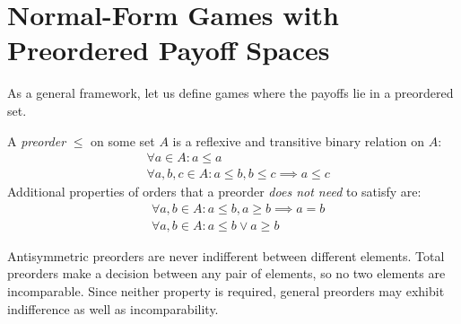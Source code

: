\documentclass[a4paper]{scrreprt}
\begin{document}
    \section{Normal-Form Games with Preordered Payoff Spaces}
    \label{sec:preorderedPayoffSpaceGames}
    
    As a general framework, let us define games where the payoffs lie in a preordered set.
    \begin{defn}[Preorder]
        A \emph{preorder} $\leq$ on some set $A$ is a reflexive and transitive binary relation on $A$:
        \begin{align*}
            &\forall a \in A: a \leq a \tag{Reflexivity} \\
            &\forall a, b, c \in A: a \leq b, b \leq c \implies a \leq c \tag{Transitivity}
        \end{align*}
        Additional properties of orders that a preorder \emph{does not need} to satisfy are:
        \begin{align*}
            &\forall a, b \in A: a \leq b, a \geq b \implies a = b \tag{Antisymmetry} \\
            &\forall a, b \in A: a \leq b \vee a \geq b \tag{Totality}
        \end{align*}
    \end{defn}
    Antisymmetric preorders are never indifferent between different elements. Total preorders make a decision between any pair of elements, so no two elements are incomparable. Since neither property is required, general preorders may exhibit indifference as well as incomparability.
    
    \let\popref\geq
    \let\pononpref\leq
    \let\postrpref>
    \let\postrnonpref<    
\end{document}
